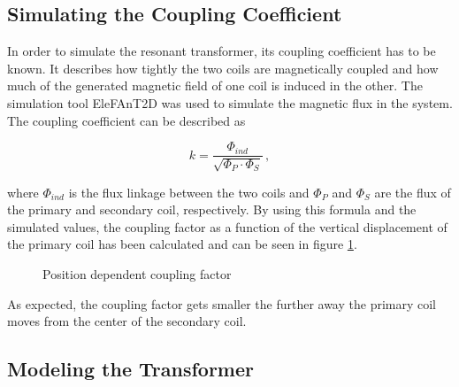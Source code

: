 \subsection[Simulating the Coupling]{Simulating the Coupling Coefficient}

In order to simulate the resonant transformer, its coupling coefficient has to be known. It describes how tightly the two coils are magnetically coupled and how much of the generated magnetic field of one coil is induced in the other. The simulation tool EleFAnT2D was used to simulate the magnetic flux in the system. 
\newpage
The coupling coefficient can be described as

\begin{equation}
    k = \frac{\Phi_{ind}}{\sqrt{\Phi_P \cdot \Phi_S}}\,,
\end{equation}

where \(\Phi_{ind}\) is the flux linkage between the two coils and \(\Phi_P\) and \(\Phi_S\) are the flux of the primary and secondary coil, respectively. By using this formula and the simulated values, the coupling factor as a function of the vertical displacement of the primary coil has been calculated and can be seen in figure \ref{fig:coupling-factor}.

\begin{figure}[h!]
    \centering
    \caption{Position dependent coupling factor}
    \label{fig:coupling-factor}
\end{figure}

As expected, the coupling factor gets smaller the further away the primary coil moves from the center of the secondary coil.

\subsection{Modeling the Transformer}

